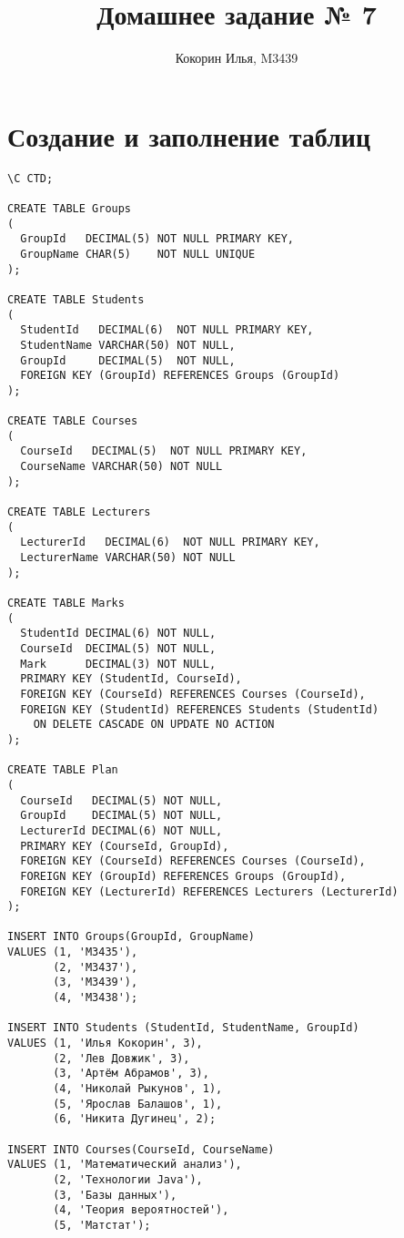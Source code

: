\documentclass{article}
\title{Домашнее задание № 7}
\author{Кокорин Илья, M3439}
\begin{document}
	\maketitle
	
	\section{Создание и заполнение таблиц}
\begin{verbatim}
\C CTD;

CREATE TABLE Groups
(
  GroupId   DECIMAL(5) NOT NULL PRIMARY KEY,
  GroupName CHAR(5)    NOT NULL UNIQUE
);

CREATE TABLE Students
(
  StudentId   DECIMAL(6)  NOT NULL PRIMARY KEY,
  StudentName VARCHAR(50) NOT NULL,
  GroupId     DECIMAL(5)  NOT NULL,
  FOREIGN KEY (GroupId) REFERENCES Groups (GroupId)
);

CREATE TABLE Courses
(
  CourseId   DECIMAL(5)  NOT NULL PRIMARY KEY,
  CourseName VARCHAR(50) NOT NULL
);

CREATE TABLE Lecturers
(
  LecturerId   DECIMAL(6)  NOT NULL PRIMARY KEY,
  LecturerName VARCHAR(50) NOT NULL
);

CREATE TABLE Marks
(
  StudentId DECIMAL(6) NOT NULL,
  CourseId  DECIMAL(5) NOT NULL,
  Mark      DECIMAL(3) NOT NULL,
  PRIMARY KEY (StudentId, CourseId),
  FOREIGN KEY (CourseId) REFERENCES Courses (CourseId),
  FOREIGN KEY (StudentId) REFERENCES Students (StudentId)
    ON DELETE CASCADE ON UPDATE NO ACTION
);

CREATE TABLE Plan
(
  CourseId   DECIMAL(5) NOT NULL,
  GroupId    DECIMAL(5) NOT NULL,
  LecturerId DECIMAL(6) NOT NULL,
  PRIMARY KEY (CourseId, GroupId),
  FOREIGN KEY (CourseId) REFERENCES Courses (CourseId),
  FOREIGN KEY (GroupId) REFERENCES Groups (GroupId),
  FOREIGN KEY (LecturerId) REFERENCES Lecturers (LecturerId)
);

INSERT INTO Groups(GroupId, GroupName)
VALUES (1, 'M3435'),
       (2, 'M3437'),
       (3, 'M3439'),
       (4, 'M3438');

INSERT INTO Students (StudentId, StudentName, GroupId)
VALUES (1, 'Илья Кокорин', 3),
       (2, 'Лев Довжик', 3),
       (3, 'Артём Абрамов', 3),
       (4, 'Николай Рыкунов', 1),
       (5, 'Ярослав Балашов', 1),
       (6, 'Никита Дугинец', 2);

INSERT INTO Courses(CourseId, CourseName)
VALUES (1, 'Математический анализ'),
       (2, 'Технологии Java'),
       (3, 'Базы данных'),
       (4, 'Теория вероятностей'),
       (5, 'Матстат');


\end{verbatim}
\end{document}
